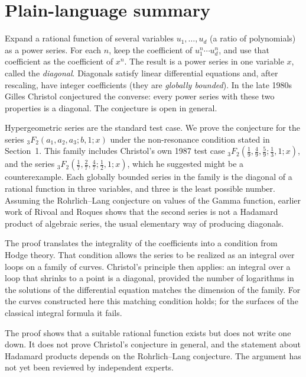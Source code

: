 \documentclass[11pt]{amsart}
\theoremstyle{definition}
\theoremstyle{remark}
\numberwithin{equation}{section}
\begin{document}
\section*{Plain-language summary}

Expand a rational function of several variables $u_1,\dots,u_d$ (a ratio of polynomials) as a power series. For each $n$, keep the coefficient of $u_1^n\cdots u_d^n$, and use that coefficient as the coefficient of $x^n$. The result is a power series in one variable $x$, called the \emph{diagonal}. Diagonals satisfy linear differential equations and, after rescaling, have integer coefficients (they are \emph{globally bounded}). In the late 1980s Gilles Christol conjectured the converse: every power series with these two properties is a diagonal. The conjecture is open in general.

Hypergeometric series are the standard test case. We prove the conjecture for the series ${}_3F_2(a_1,a_2,a_3;b,1;x)$ under the non-resonance condition stated in Section~1. This family includes Christol's own 1987 test case ${}_3F_2(\frac19,\frac49,\frac59;\frac13,1;x)$, and the series ${}_3F_2(\frac17,\frac27,\frac47;\frac12,1;x)$, which he suggested might be a counterexample. Each globally bounded series in the family is the diagonal of a rational function in three variables, and three is the least possible number. Assuming the Rohrlich--Lang conjecture on values of the Gamma function, earlier work of Rivoal and Roques shows that the second series is not a Hadamard product of algebraic series, the usual elementary way of producing diagonals.

The proof translates the integrality of the coefficients into a condition from Hodge theory. That condition allows the series to be realized as an integral over loops on a family of curves. Christol's principle then applies: an integral over a loop that shrinks to a point is a diagonal, provided the number of logarithms in the solutions of the differential equation matches the dimension of the family. For the curves constructed here this matching condition holds; for the surfaces of the classical integral formula it fails.

The proof shows that a suitable rational function exists but does not write one down. It does not prove Christol's conjecture in general, and the statement about Hadamard products depends on the Rohrlich--Lang conjecture. The argument has not yet been reviewed by independent experts.

\setcounter{tocdepth}{1}
\tableofcontents
\end{document}
